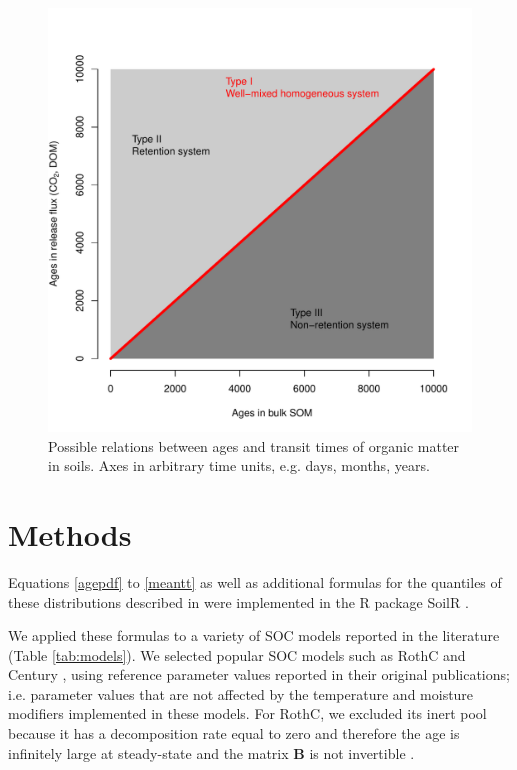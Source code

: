 \documentclass[draft,linenumbers]{agujournal}
\providecommand{\DIFdelbegin}{} %
\begin{document}
\begin{figure}[t]
   \centering
   \includegraphics[scale=0.75]{Figures/systemTypes} %
   \caption{Possible relations between ages and transit times of organic matter in soils. Axes in arbitrary time units, e.g. days, months, years.}
   \label{fig:hypotheses}
\end{figure}


\section{Methods}
Equations \ref{agepdf} to \ref{meantt} as well as additional formulas for the quantiles of these distributions described in \citet{Metzler2018MG} were implemented in the R package SoilR \citep{Sierra2014GMD}.

We applied these formulas to a variety of SOC models reported in the literature (Table \ref{tab:models}). We selected popular SOC models such as RothC and Century \citep{Jenkinson1990, Parton1987}, using reference parameter values reported in their original publications; i.e. parameter values that are not affected by the temperature and moisture modifiers implemented in these models. For RothC, we excluded its inert pool because it has a decomposition rate equal to zero and therefore the age is infinitely large at steady-state and the matrix $\mathbf{B}$ is not invertible \citep{Metzler2018MG}. 
\DIFdelbegin %
\end{document}
